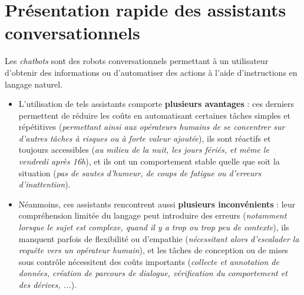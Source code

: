 	\minitoc
	
	
	\newpage
	\section{Présentation rapide des assistants conversationnels}
	\label{annex:B.1-ANNEXE-CHATBOTS-PRESENTATION}
	
		Les \textit{chatbots} sont des robots conversationnels permettant à un utilisateur d'obtenir des informations ou d'automatiser des actions à l'aide d'instructions en langage naturel.
		\begin{itemize}
			\item[\textcolor{colorDarkPastelGreen}{\textcolor{colorDarkPastelGreen}{\faThumbsUp}}] L'utilisation de tels assistants comporte \textbf{plusieurs avantages} :
			ces derniers permettent de réduire les coûts en automatisant certaines tâches simples et répétitives (\textit{permettant ainsi aux opérateurs humains de se concentrer sur d'autres tâches à risques ou à forte valeur ajoutée}),
			ils sont réactifs et toujours accessibles (\textit{au milieu de la nuit, les jours fériés, et même le vendredi après 16h}),
			et ils ont un comportement stable quelle que soit la situation (\textit{pas de sautes d'humeur, de coups de fatigue ou d'erreurs d'inattention}).
			\item[\textcolor{colorDarkPastelRed}{\textcolor{colorDarkPastelRed}{\faThumbsDown}}] Néanmoins, ces assistants rencontrent aussi \textbf{plusieurs inconvénients} :
			leur compréhension limitée du langage peut introduire des erreurs (\textit{notamment lorsque le sujet est complexe, quand il y a trop ou trop peu de contexte}),
			ils manquent parfois de flexibilité ou d'empathie (\textit{nécessitant alors d'escalader la requête vers un opérateur humain}),
			et les tâches de conception ou de mises sous contrôle nécessitent des coûts importants (\textit{collecte et annotation de données, création de parcours de dialogue, vérification du comportement et des dérives, ...}).
		\end{itemize}
		
